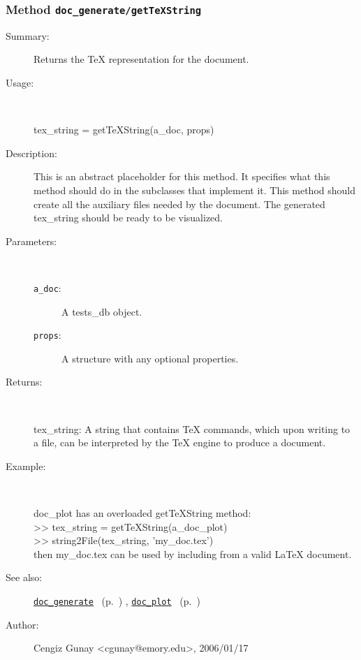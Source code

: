 \subsubsection[Method \texttt{getTeXString}]{Method \texttt{doc\_generate/getTeXString}}%
%
\label{ref_doc_generate__getTeXString}%
\hypertarget{ref_doc_generate__getTeXString}{}%
\begin{description}
\item[Summary:]Returns the TeX representation for the document.
%
\item[Usage:]~%
\begin{lyxcode}%
tex\_string = getTeXString(a\_doc, props)
%
\end{lyxcode}%
%
\item[Description:]%
This is an abstract placeholder for this method. It specifies what this 
 method should do in the subclasses that implement it. This method should
 create all the auxiliary files needed by the document. The generated tex\_string
 should be ready to be visualized.
\item[Parameters:]~
\begin{description}%
\item[\texttt{a\_doc}:]
 A tests\_db object.
\item[\texttt{props}:]
 A structure with any optional properties.
\end{description}%
%
\item[Returns:]~

	tex\_string: A string that contains TeX commands, which upon writing to a file,
	  can be interpreted by the TeX engine to produce a document.
%
\item[Example:]~
\begin{lyxcode}        doc\_plot has an overloaded getTeXString method:\\%
        >> tex\_string = getTeXString(a\_doc\_plot)\\%
        >> string2File(tex\_string, 'my\_doc.tex')\\%
        then my\_doc.tex can be used by including from a valid LaTeX document.\\%
\end{lyxcode}
%
\item[See also:]%
\hyperlink{ref_doc_generate}{\texttt{doc\_generate}}%
\ (p.~\pageref{ref_doc_generate})%
%
, \hyperlink{ref_doc_plot}{\texttt{doc\_plot}}%
\ (p.~\pageref{ref_doc_plot})%
%
%
\item[Author:]%
Cengiz Gunay <cgunay@emory.edu>, 2006/01/17%
\end{description}
\methodline%
